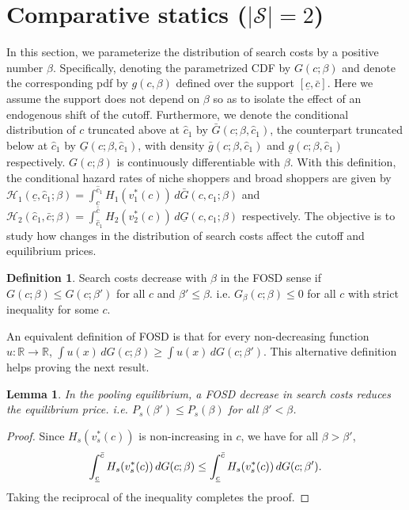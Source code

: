 \documentclass[14pt]{article}
\theoremstyle{plain}
\newtheorem{lemma}[thm]{Lemma}
\theoremstyle{definition}
\newtheorem{defn}{Definition}[section]
\theoremstyle{remark}
\DeclareRobustCommand\1{\futurelet\oneNext\oneCheck}
\renewcommand{\S}{\mathcal{S}}
\renewcommand{\H}{\mathcal{H}}
\newcommand{\R}{\mathbb{R}}
\begin{document}
\section{Comparative statics ($\lvert\S \rvert = 2$)}\label{section:comparative statics}
In this section, we parameterize the distribution of search costs by a positive number $\beta$. Specifically, denoting the parametrized CDF by $G(c; \beta)$ and denote the corresponding pdf by $g(c, \beta)$ defined over the support $[\underline{c}, \bar{c}]$. Here we assume the support does not depend on $\beta$ so as to isolate the effect of an endogenous shift of the cutoff. Furthermore, we denote the conditional distribution of $c$ truncated above at $\hat{c}_1$ by $\bar{G}(c;\beta, \hat{c}_1 )$, the counterpart truncated below at $\hat{c}_1$ by $\underline{G}(c;\beta,\hat{c}_1)$, with density $\bar{g}(c;\beta, \hat{c}_1 )$ and $\underline{g}(c;\beta, \hat{c}_1 )$ respectively.  $G(c;\beta)$ is continuously differentiable with  $\beta$. With this definition, the conditional hazard rates of niche shoppers and broad shoppers are given by  $\H_1(\underline{c}, \hat{c}_1;\beta) = \int^{\hat{c}_1}_{\underline{c}}H_1(v_1^*(c))\,d\bar{G}(c,\hat{c}_1;\beta)$ and $\H_2(\hat{c}_1, \bar{c};\beta) = \int_{\hat{c}_1}^{\bar{c}}H_2(v_2^*(c))\,d\underline{G}(c,\hat{c}_1;\beta)$ respectively. The objective is to study how changes in the distribution of search costs affect the cutoff and equilibrium prices.
\begin{defn}
Search costs decrease with $\beta$ in the FOSD sense if $G(c; \beta)\leq G(c;\beta')$ for all $c$ and $\beta'\leq \beta$. i.e. $G_{\beta}(c;\beta)\leq 0$ for all $c$ with strict inequality for some $c$.
\end{defn}
\noindent An equivalent definition of FOSD is that for every non-decreasing function $u:\R\to \R$, $\int u(x)\,dG(c;\beta)\geq \int u(x)\, dG(c;\beta')$. This alternative definition helps proving the next result.
\begin{lemma}
In the pooling equilibrium, a FOSD decrease in search costs reduces the equilibrium price. i.e. $P_s(\beta')\leq P_s(\beta)$ for all $\beta'<\beta$.
\end{lemma}
\begin{proof}
Since $H_s(v_s^*(c))$ is non-increasing in $c$, 
 we have for all $\beta>\beta'$,
\[\int^{\Bar{c}}_{\underline{c}}H_s(v_s^*(c))\,dG(c;\beta)\leq \int^{\Bar{c}}_{\underline{c}}H_s(v_s^*(c))\,dG(c;\beta').\]
Taking the reciprocal of the inequality completes the proof.
\end{proof}
\end{document}
